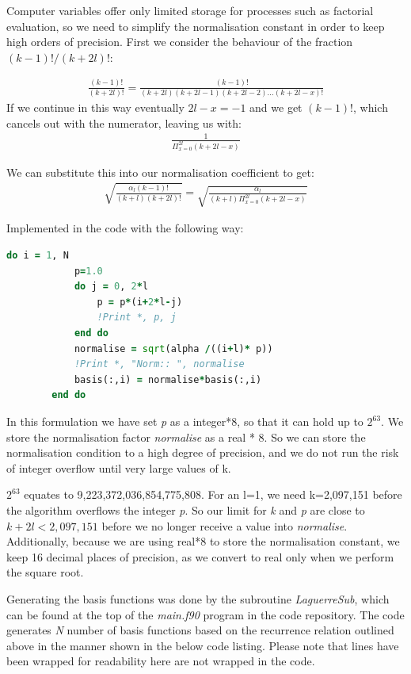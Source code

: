 \documentclass{article}
\begin{document}
    Computer variables offer only limited storage for processes such as factorial evaluation, so we need to simplify the normalisation constant in order to keep high orders of precision. First we consider the behaviour of the fraction
    $(k-1)!/(k+2l)!$:
    
    \begin{gather}
    	\frac{(k-1)!}{(k+2l)!} = \frac{(k-1)!}{(k+2l)(k+2l-1)(k+2l-2)...(k+2l-x)!}
    \end{gather}
    If we continue in this way eventually $2l-x=-1$ and we get $(k-1)!$, which cancels out with the numerator, leaving us with:
    \begin{gather}
    	\frac{1}{\Pi_{x=0}^{2l}(k+2l-x)}
    \end{gather}
    
    We can substitute this into our normalisation coefficient to get:
    \begin{gather}
    	\sqrt{\frac{\alpha_l (k-1)!}{(k+l)(k+2l)!}} = \sqrt{\frac{\alpha_l}{(k+l)\Pi_{x=0}^{2l}(k+2l-x)}}
    \end{gather}
    
    Implemented in the code with the following way:
    \begin{lstlisting}[language=Fortran]
    	do i = 1, N
    		p=1.0
	    	do j = 0, 2*l
	    		p = p*(i+2*l-j)
	    		!Print *, p, j
	    	end do
	    	normalise = sqrt(alpha /((i+l)* p))
	    	!Print *, "Norm:: ", normalise
	    	basis(:,i) = normalise*basis(:,i)
    	end do
    \end{lstlisting}
    
    In this formulation we have set \textit{p} as a integer*8, so that it can hold up to $2^{63}$. We store the normalisation factor \textit{normalise} as a real * 8. So we can store the normalisation condition to a high degree of precision, and we do not run the risk of integer overflow until very large values of k. 
    
    $2^{63}$ equates to 9,223,372,036,854,775,808. For an l=1, we need k=2,097,151 before the algorithm overflows the integer \textit{p}. So our limit for \textit{k} and \textit{p} are close to $k+2l < 2,097,151$ before we no longer receive a value into \textit{normalise}. Additionally, because we are using real*8 to store the normalisation constant, we keep 16 decimal places of precision, as we convert to real only when we perform the square root.
    
    Generating the basis functions was done by the subroutine \textit{LaguerreSub}, which can be found at the top of the \textit{main.f90} program in the code repository. The code generates \textit{N} number of basis functions based on the recurrence relation outlined above in the manner shown in the below code listing. Please note that lines have been wrapped for readability here are not wrapped in the code.
    
\end{document}
